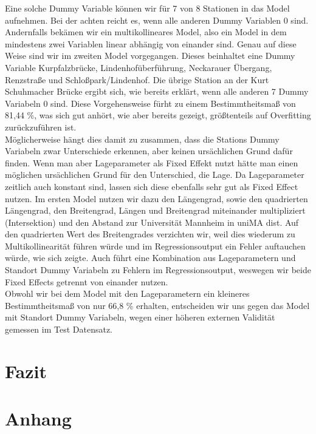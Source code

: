 \documentclass[a4paper,12pt]{thesis}
\begin{document}
Eine solche Dummy Variable können wir für 7 von 8 Stationen in das Model aufnehmen. Bei der achten reicht es, wenn alle anderen Dummy Variablen 0 sind. Andernfalls bekämen wir ein multikollineares Model, also ein Model in dem mindestens zwei Variablen linear abhängig von einander sind. Genau auf diese Weise sind wir im zweiten Model vorgegangen. Dieses beinhaltet eine Dummy Variable Kurpfalzbrücke, Lindenhofüberführung, Neckarauer Übergang, Renzstraße und Schloßpark/Lindenhof. Die übrige Station an der Kurt Schuhmacher Brücke ergibt sich, wie bereits erklärt, wenn alle anderen 7 Dummy Variabeln 0 sind. Diese Vorgehensweise fürht zu einem Bestimmtheitsmaß von 81,44 \%, was sich gut anhört, wie aber bereits gezeigt, größtenteils auf Overfitting zurückzuführen ist.\\

Möglicherweise hängt dies damit zu zusammen, dass die Stations Dummy Variabeln zwar Unterschiede erkennen, aber keinen ursächlichen Grund dafür finden. Wenn man aber Lageparameter als Fixed Effekt nutzt hätte man einen möglichen ursächlichen Grund für den Unterschied, die Lage. Da Lageparameter zeitlich auch konstant sind, lassen sich diese ebenfalls sehr gut als Fixed Effect nutzen. Im ersten Model nutzen wir dazu den Längengrad, sowie den quadrierten Längengrad, den Breitengrad, Längen und Breitengrad miteinander multipliziert (Intersektion) und den Abstand zur Universität Mannheim in uniMA dist. Auf den quadrierten Wert des Breitengrades verzichten wir, weil dies wiederum zu Multikollinearität führen würde und im Regressionsoutput ein Fehler auftauchen würde, wie sich zeigte. Auch führt eine Kombination aus Lageparametern und Standort Dummy Variabeln zu Fehlern im Regressionsoutput, weswegen wir beide Fixed Effects getrennt von einander nutzen.\\

Obwohl wir bei dem Model mit den Lageparametern ein kleineres Bestimmtheitsmaß von nur 66,8 \% erhalten, entscheiden wir uns gegen das Model mit Standort Dummy Variabeln, wegen einer höheren externen Validität gemessen im Test Datensatz.

\chapter{Fazit}

\chapter{Anhang}
\end{document}
